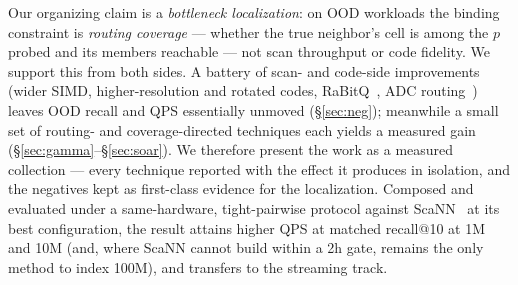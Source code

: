 \documentclass{article}
\begin{document}
Our organizing claim is a \emph{bottleneck localization}: on OOD workloads the
binding constraint is \emph{routing coverage} --- whether the true neighbor's cell is
among the $p$ probed and its members reachable --- not scan throughput or code
fidelity. We support this from both sides. A battery of scan- and code-side
improvements (wider SIMD, higher-resolution and rotated codes, RaBitQ~\cite{rabitq}, ADC routing~\cite{quickeradc})
leaves OOD recall and QPS essentially unmoved (\S\ref{sec:neg}); meanwhile a small
set of routing- and coverage-directed techniques each yields a measured gain
(\S\ref{sec:gamma}--\S\ref{sec:soar}). We therefore present the work as a measured
collection --- every technique reported with the effect it produces in isolation,
and the negatives kept as first-class evidence for the localization. Composed and
evaluated under a same-hardware, tight-pairwise protocol against ScaNN~\cite{scann} at its best
configuration, the result attains higher QPS at matched recall@10 at 1M and 10M
(and, where ScaNN cannot build within a 2h gate, remains the only method to index 100M),
and transfers to the streaming track.
\end{document}
